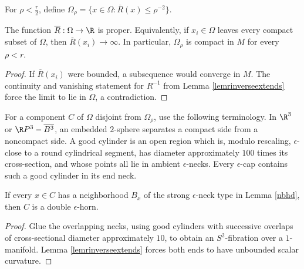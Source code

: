 \begin{definition}
  \label{def:kl-structure-at-first-singularity-time-curvature-sublevel-regular-set}

For $\rho<\frac r2$, define
$\displaystyle\Omega_\rho=\{x\in\Omega:\overline R(x)\leq\rho^{-2}\}$.
\end{definition}

\begin{lemma}
  \label{lem:kl-structure-at-first-singularity-time-characterization-structure-at-first-singularity-time}

\label{lemoverlinerisproper}
The function $\overline R:\Omega\to\R$ is proper. Equivalently, if
$x_i\in\Omega$ leaves every compact subset of $\Omega$, then
$\overline R(x_i)\to\infty$. In particular, $\Omega_\rho$ is compact in $M$
for every $\rho<r$.
\end{lemma}
\begin{proof}
\sketch If $\overline R(x_i)$ were bounded, a subsequence would converge in
$M$. The continuity and vanishing statement for $R^{-1}$ from Lemma
\ref{lemrinverseextends} force the limit to lie in $\Omega$, a contradiction.
\end{proof}

For a component $C$ of $\Omega$ disjoint from $\Omega_\rho$, use the following
terminology. In $\R^3$ or $\R P^3-\overline{B^3}$, an embedded $2$-sphere
separates a compact side from a noncompact side. A good cylinder is an open
region which is, modulo rescaling, $\epsilon$-close to a round cylindrical
segment, has diameter approximately $100$ times its cross-section, and whose
points all lie in ambient $\epsilon$-necks. Every $\epsilon$-cap contains such
a good cylinder in its end neck.

\begin{lemma}
  \label{lem:kl-structure-at-first-singularity-time-neck-geometry-lemma}
 \label{doublehorn}
If every $x\in C$ has a neighborhood $B_x$ of the strong $\epsilon$-neck type
in Lemma \ref{nbhd}, then $C$ is a double $\epsilon$-horn.
\end{lemma}
\begin{proof}
\sketch Glue the overlapping necks, using good cylinders with successive
overlaps of cross-sectional diameter approximately $10$, to obtain an
$S^2$-fibration over a $1$-manifold. Lemma \ref{lemrinverseextends} forces both
ends to have unbounded scalar curvature.
\end{proof}

